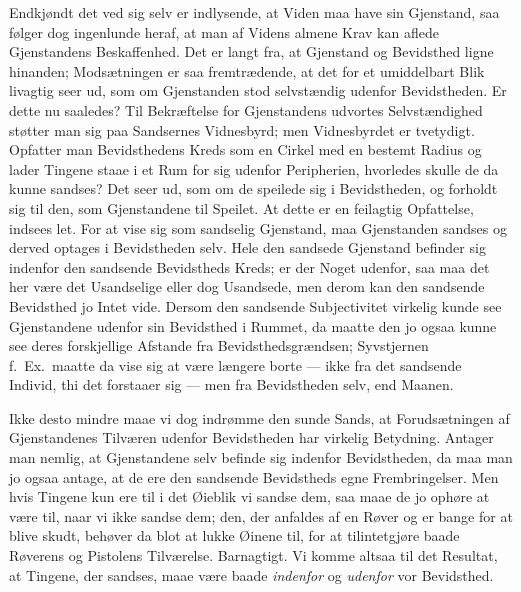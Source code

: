 \documentclass[12pt]{book}
\newcommand{\apage}[1]{\marginnote{\footnotesize\textit{[#1]}}}
\begin{document}
\noindent Endkjøndt det ved sig selv er indlysende, at Viden maa have
sin Gjenstand, saa følger dog ingenlunde heraf, at man af Videns almene
Krav kan aflede Gjenstandens Beskaffenhed. Det er langt fra, at Gjenstand
og Bevidsthed ligne hinanden; Modsætningen er saa  \apage{10} fremtrædende, at det
for et umiddelbart Blik livagtig seer ud, som om Gjenstanden stod
selvstændig udenfor Bevidstheden. Er dette nu saaledes? Til Bekræftelse
for Gjenstandens udvortes Selvstændighed støtter man sig paa Sandsernes
Vidnesbyrd; men Vidnesbyrdet er tvetydigt. Opfatter man Bevidsthedens
Kreds som en Cirkel med en bestemt Radius og lader Tingene staae i et Rum
for sig udenfor Peripherien, hvorledes skulle de da kunne sandses? Det
seer ud, som om de speilede sig i Bevidstheden, og forholdt sig til den,
som Gjenstandene til Speilet. At dette er en feilagtig Opfattelse, indsees
let. For at vise sig som sandselig Gjenstand, maa Gjenstanden sandses og
derved optages i Bevidstheden selv. Hele den sandsede Gjenstand befinder
sig indenfor den sandsende Bevidstheds Kreds; er der Noget udenfor, saa
maa det her være det Usandselige eller dog Usandsede, men derom kan den
sandsende Bevidsthed jo Intet vide. Dersom den sandsende Subjectivitet
virkelig kunde see Gjenstandene udenfor sin Bevidsthed i Rummet, da maatte
den jo ogsaa kunne see deres forskjellige Afstande fra
Bevidsthedsgrændsen; Syvstjernen f.\ Ex.\ maatte da vise sig at være
længere borte --- ikke fra det sandsende Individ, thi det forstaaer sig
--- men fra Bevidstheden selv, end Maanen.

Ikke desto mindre maae vi dog indrømme den sunde Sands, at Forudsætningen
af Gjenstandenes Tilværen udenfor Bevidstheden har virkelig Betydning.
Antager man nemlig, at Gjenstandene selv befinde sig indenfor
Bevidstheden, da maa man jo ogsaa antage, \apage{11} at de ere den sandsende
Bevidstheds egne Frembringelser. Men hvis Tingene kun ere til i det
Øieblik vi sandse dem, saa maae de jo ophøre at være til, naar vi ikke
sandse dem; den, der anfaldes af en Røver og er bange for at blive skudt,
behøver da blot at lukke Øinene til, for at tilintetgjøre baade Røverens
og Pistolens Tilværelse. Barnagtigt. Vi komme altsaa til det Resultat, at
Tingene, der sandses, maae være baade \emph{indenfor} og \emph{udenfor} vor Bevidsthed.
\end{document}
